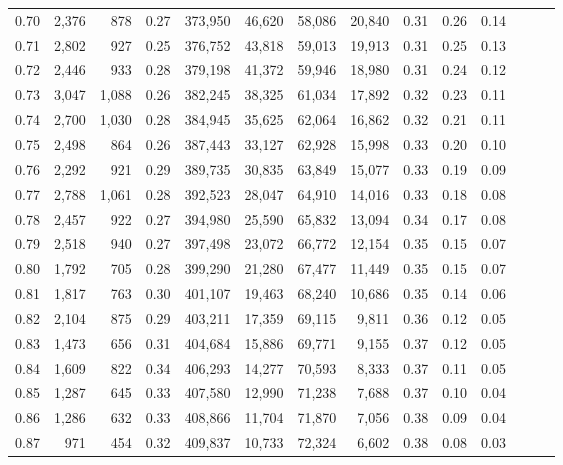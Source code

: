 \begin{tabular}{rrrrrrrrrrrrrr}
0.70 &   2,376 &    878 &  0.27 &  373,950 &   46,620 &  58,086 &  20,840 &  0.31 &  0.26 &      0.14 \\
0.71 &   2,802 &    927 &  0.25 &  376,752 &   43,818 &  59,013 &  19,913 &  0.31 &  0.25 &      0.13 \\
0.72 &   2,446 &    933 &  0.28 &  379,198 &   41,372 &  59,946 &  18,980 &  0.31 &  0.24 &      0.12 \\
0.73 &   3,047 &  1,088 &  0.26 &  382,245 &   38,325 &  61,034 &  17,892 &  0.32 &  0.23 &      0.11 \\
0.74 &   2,700 &  1,030 &  0.28 &  384,945 &   35,625 &  62,064 &  16,862 &  0.32 &  0.21 &      0.11 \\
0.75 &   2,498 &    864 &  0.26 &  387,443 &   33,127 &  62,928 &  15,998 &  0.33 &  0.20 &      0.10 \\
0.76 &   2,292 &    921 &  0.29 &  389,735 &   30,835 &  63,849 &  15,077 &  0.33 &  0.19 &      0.09 \\
0.77 &   2,788 &  1,061 &  0.28 &  392,523 &   28,047 &  64,910 &  14,016 &  0.33 &  0.18 &      0.08 \\
0.78 &   2,457 &    922 &  0.27 &  394,980 &   25,590 &  65,832 &  13,094 &  0.34 &  0.17 &      0.08 \\
0.79 &   2,518 &    940 &  0.27 &  397,498 &   23,072 &  66,772 &  12,154 &  0.35 &  0.15 &      0.07 \\
0.80 &   1,792 &    705 &  0.28 &  399,290 &   21,280 &  67,477 &  11,449 &  0.35 &  0.15 &      0.07 \\
0.81 &   1,817 &    763 &  0.30 &  401,107 &   19,463 &  68,240 &  10,686 &  0.35 &  0.14 &      0.06 \\
0.82 &   2,104 &    875 &  0.29 &  403,211 &   17,359 &  69,115 &   9,811 &  0.36 &  0.12 &      0.05 \\
0.83 &   1,473 &    656 &  0.31 &  404,684 &   15,886 &  69,771 &   9,155 &  0.37 &  0.12 &      0.05 \\
0.84 &   1,609 &    822 &  0.34 &  406,293 &   14,277 &  70,593 &   8,333 &  0.37 &  0.11 &      0.05 \\
0.85 &   1,287 &    645 &  0.33 &  407,580 &   12,990 &  71,238 &   7,688 &  0.37 &  0.10 &      0.04 \\
0.86 &   1,286 &    632 &  0.33 &  408,866 &   11,704 &  71,870 &   7,056 &  0.38 &  0.09 &      0.04 \\
0.87 &     971 &    454 &  0.32 &  409,837 &   10,733 &  72,324 &   6,602 &  0.38 &  0.08 &      0.03 \\

\end{tabular}
